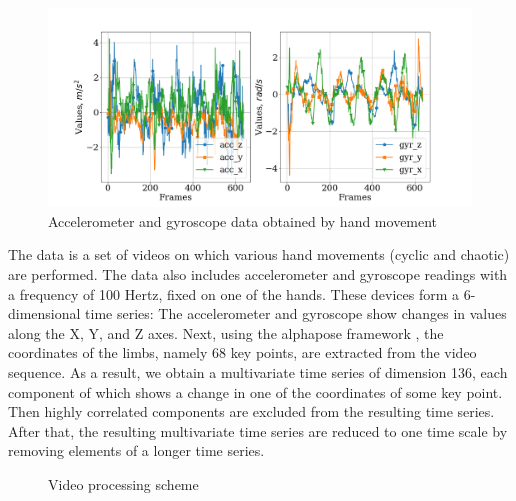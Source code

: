 \documentclass[bst/sn-mathphys]{sn-jnl}%
\theoremstyle{thmstyleone}%
\theoremstyle{thmstyletwo}%
\theoremstyle{thmstylethree}%
\begin{document}
\begin{figure}[bhtp]
	\includegraphics[width=\textwidth]{cyclic_devices_data.png}
	\caption{Accelerometer and gyroscope data obtained by hand movement}
	\label{fig:devices_data}
\end{figure}
The data is a set of videos on which various hand movements (cyclic and chaotic) are performed. 
The data also includes accelerometer and gyroscope readings with a frequency of 100 Hertz, fixed on one of the hands.
These devices form a 6-dimensional time series: The accelerometer and gyroscope show changes in values along the X, Y, and Z axes.
Next, using the alphapose framework \cite{alphapose_fang2017rmpe, alphapose_li2019crowdpose, alphapose_xiu2018poseflow}, the coordinates of the limbs, namely 68 key points, are extracted from the video sequence.
As a result, we obtain a multivariate time series of dimension 136, each component of which shows a change in one of the coordinates of some key point.
Then highly correlated components are excluded from the resulting time series.
After that, the resulting multivariate time series are reduced to one time scale by removing elements of a longer time series.

\begin{figure}[bhtp]
	\centering
	\caption{Video processing scheme}
	\label{fig:video_data}
\end{figure}
\end{document}
